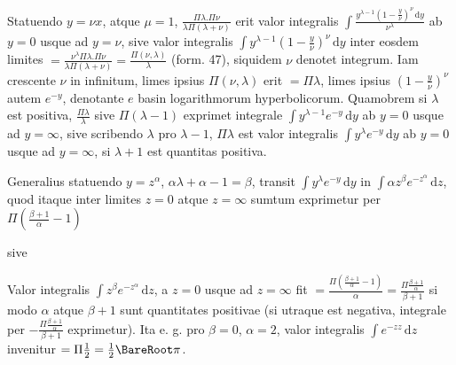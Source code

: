 Statuendo $y=\nu x$, atque $\mu=1$,
$\frac{\Pi\lambda.\Pi\nu}{\lambda\Pi(\lambda+\nu)}$
erit valor integralis
$\int\frac{y^{\lambda-1}(1-\frac y\nu)^\nu\,\mathrm{d}y}{\nu^\lambda}$ ab $y=0$ usque ad $y=\nu$, sive valor integralis
$\int y^{\lambda-1}(1-\frac y\nu)^\nu\,\mathrm{d}y$
inter eosdem limites
$=\frac{\nu^\lambda\Pi\lambda.\Pi\nu}{\lambda\Pi(\lambda+\nu)}
=\frac{\Pi(\nu,\lambda)}\lambda$ (form. 47), siquidem $\nu$
denotet integrum. Iam crescente $\nu$ in infinitum, limes ipsius
$\Pi(\nu,\lambda)$ erit $=\Pi\lambda$, limes ipsius
$(1-\frac y\nu)^\nu$ autem $e^{-y}$, denotante $e$ basin
logarithmorum hyperbolicorum. Quamobrem si $\lambda$ est positiva,
$\frac{\Pi\lambda}\lambda$ sive $\Pi(\lambda-1)$ exprimet integrale
$\int y^{\lambda-1}e^{-y}\,\mathrm{d}y$ ab $y=0$ usque ad
$y=\infty$, sive scribendo $\lambda$ pro $\lambda-1$,
$\Pi\lambda$ est valor integralis
$\int y^\lambda e^{-y}\,\mathrm{d}y$ ab $y=0$ usque ad
$y=\infty$, si $\lambda+1$ est quantitas positiva.

Generalius statuendo $y=z^\alpha$,
$\alpha\lambda+\alpha-1=\beta$, transit
$\int y^\lambda e^{-y}\,\mathrm{d}y$ in
$\int\alpha z^\beta e^{-z^\alpha}\,\mathrm{d}z$, quod itaque
inter limites $z=0$ atque $z=\infty$ sumtum exprimetur per
$\Pi(\frac{\beta+1}\alpha-1)$

\noindent sive

Valor integralis $\int z^\beta e^{-z^\alpha}\,\mathrm{d}z$,
a $z=0$ usque ad $z=\infty$ fit
$=\frac{\Pi(\frac{\beta+1}\alpha-1)}\alpha
=\frac{\Pi\frac{\beta+1}\alpha}{\beta+1}$
si modo $\alpha$ atque $\beta+1$ sunt quantitates positivae
(si utraque est negativa, integrale per $-\frac{\Pi\frac{\beta+1}\alpha}{\beta+1}$
exprimetur). Ita e. g. pro $\beta=0$, $\alpha=2$, valor
integralis $\int e^{-zz}\,\mathrm{d}z$ invenitur
$=\Pi\frac12=\frac12\BareRoot\pi$.

